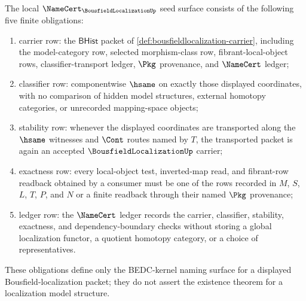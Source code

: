 \begin{theorem}
\label{thm:bousfieldlocalization-namecert-obligations}
The local $\NameCert_{\BousfieldLocalizationUp}$ seed surface consists of the following five finite obligations:
\begin{enumerate}
\item carrier row: the $\mathsf{BHist}$ packet of \autoref{def:bousfieldlocalization-carrier}, including the model-category row, selected morphism-class row, fibrant-local-object rows, classifier-transport ledger, $\Pkg$ provenance, and $\NameCert$ ledger;
\item classifier row: componentwise $\hsame$ on exactly those displayed coordinates, with no comparison of hidden model structures, external homotopy categories, or unrecorded mapping-space objects;
\item stability row: whenever the displayed coordinates are transported along the $\hsame$ witnesses and $\Cont$ routes named by $T$, the transported packet is again an accepted $\BousfieldLocalizationUp$ carrier;
\item exactness row: every local-object test, inverted-map read, and fibrant-row readback obtained by a consumer must be one of the rows recorded in $M$, $S$, $L$, $T$, $P$, and $N$ or a finite readback through their named $\Pkg$ provenance;
\item ledger row: the $\NameCert$ ledger records the carrier, classifier, stability, exactness, and dependency-boundary checks without storing a global localization functor, a quotient homotopy category, or a choice of representatives.
\end{enumerate}
These obligations define only the BEDC-kernel naming surface for a displayed Bousfield-localization packet; they do not assert the existence theorem for a localization model structure.
\end{theorem}
